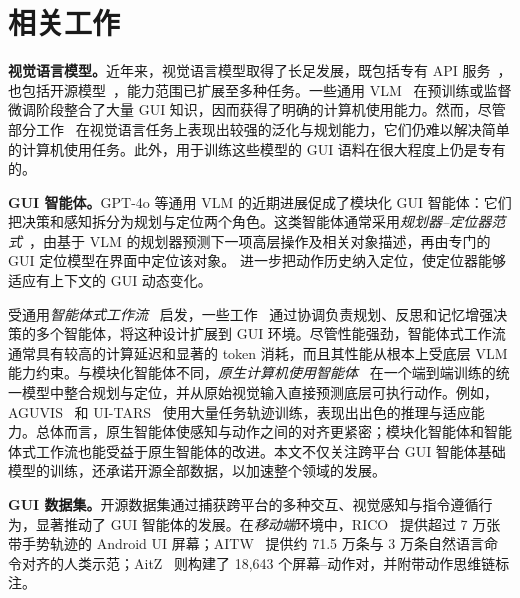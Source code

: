 \documentclass[10pt,twocolumn]{article}
\begin{document}
\section{相关工作}
\label{related_work}
\textbf{视觉语言模型。}近年来，视觉语言模型取得了长足发展，既包括专有 API 服务~\citep{team2023gemini,team2024gemini,anthropic2024claude35,xai2025grok3,OpenAI2023GPT4TR,hurst2024gpt}，也包括开源模型~\citep{wang2024qwen2vl,bai2025qwen25vl,chen2024internvl,chen2024expanding,zhu2025internvl3,coreteam2025mimovltechnicalreport,team2025gemma,metaai2025llama4}，能力范围已扩展至多种任务。一些通用 VLM~\citep{team2025kimi,guo2025seed1,bai2025qwen25vl,zhu2025internvl3,coreteam2025mimovltechnicalreport,wang2025internvl35} 在预训练或监督微调阶段整合了大量 GUI 知识，因而获得了明确的计算机使用能力。然而，尽管部分工作~\citep{hurst2024gpt,anthropic2024claude35,guo2025seed1,zhu2025internvl3,bai2025qwen25vl} 在视觉语言任务上表现出较强的泛化与规划能力，它们仍难以解决简单的计算机使用任务。此外，用于训练这些模型的 GUI 语料在很大程度上仍是专有的。

\textbf{GUI 智能体。}GPT-4o 等通用 VLM 的近期进展促成了模块化 GUI 智能体：它们把决策和感知拆分为规划与定位两个角色。这类智能体通常采用\emph{规划器--定位器范式}~\citep{cheng2024seeclick,hong2024cogagent,lu2024omniparserpurevisionbased,yu2025omniparser,wu2025gui,gou2024navigating,zhang2025guimid,wu2024osatlas,zhou2025guig1}，由基于 VLM 的规划器预测下一项高层操作及相关对象描述，再由专门的 GUI 定位模型在界面中定位该对象。\citet{yang2024aria} 进一步把动作历史纳入定位，使定位器能够适应有上下文的 GUI 动态变化。

受通用\emph{智能体式工作流}~\citep{wu2023autogen,li2023camel,hong2023metagpt} 启发，一些工作~\citep{wu2024copilot,liu2025pc,zhao2025cola,Agent-S2,chen2025map} 通过协调负责规划、反思和记忆增强决策的多个智能体，将这种设计扩展到 GUI 环境。尽管性能强劲，智能体式工作流通常具有较高的计算延迟和显著的 token 消耗，而且其性能从根本上受底层 VLM 能力约束。与模块化智能体不同，\emph{原生计算机使用智能体}~\citep{xu2024aguvis,wu2024osatlas,sun2024osgenesis,qin2025uitars,luo2025gui,liu2025infigui,sun2025scienceboard} 在一个端到端训练的统一模型中整合规划与定位，并从原始视觉输入直接预测底层可执行动作。例如，AGUVIS~\citep{xu2024aguvis} 和 UI-TARS~\citep{qin2025uitars} 使用大量任务轨迹训练，表现出出色的推理与适应能力。总体而言，原生智能体使感知与动作之间的对齐更紧密；模块化智能体和智能体式工作流也能受益于原生智能体的改进。本文不仅关注跨平台 GUI 智能体基础模型的训练，还承诺开源全部数据，以加速整个领域的发展。

\textbf{GUI 数据集。}开源数据集通过捕获跨平台的多种交互、视觉感知与指令遵循行为，显著推动了 GUI 智能体的发展。在\emph{移动端}环境中，RICO~\citep{deka2017rico} 提供超过 7 万张带手势轨迹的 Android UI 屏幕；AITW~\citep{rawles2023androidinthewild} 提供约 71.5 万条与 3 万条自然语言命令对齐的人类示范；AitZ~\citep{zhang2024aitz} 则构建了 18,643 个屏幕--动作对，并附带动作思维链标注。
\end{document}
